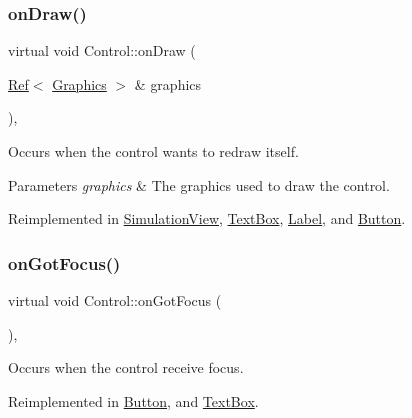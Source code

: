 \subsubsection{\texorpdfstring{onDraw()}{onDraw()}}
{\footnotesize\ttfamily virtual void Control\+::on\+Draw (\begin{DoxyParamCaption}\item[{\mbox{\hyperlink{class_ref}{Ref}}$<$ \mbox{\hyperlink{class_graphics}{Graphics}} $>$ \&}]{graphics }\end{DoxyParamCaption})\hspace{0.3cm}{\ttfamily [inline]}, {\ttfamily [virtual]}}



Occurs when the control wants to redraw itself. 


\begin{DoxyParams}{Parameters}
{\em graphics} & The graphics used to draw the control.\\
\hline
\end{DoxyParams}


Reimplemented in \mbox{\hyperlink{class_simulation_view_a088d2d9c386b7202fe0d552323c137c3}{Simulation\+View}}, \mbox{\hyperlink{class_text_box_abd8f18ee1d846bf8cdf0ab93b6302bf9}{Text\+Box}}, \mbox{\hyperlink{class_label_ac418a8328a971f5da7f46c9c6e9fd7e5}{Label}}, and \mbox{\hyperlink{class_button_afdb39226fa5833cdbbd6d061783024b7}{Button}}.

\mbox{\label{class_control_ac21652bd9bd20bd53eeab52432556a0c}} 
\subsubsection{\texorpdfstring{onGotFocus()}{onGotFocus()}}
{\footnotesize\ttfamily virtual void Control\+::on\+Got\+Focus (\begin{DoxyParamCaption}{ }\end{DoxyParamCaption})\hspace{0.3cm}{\ttfamily [inline]}, {\ttfamily [virtual]}}



Occurs when the control receive focus. 



Reimplemented in \mbox{\hyperlink{class_button_a3fd6af2ee1bdd52a0b61177f80ff7d2c}{Button}}, and \mbox{\hyperlink{class_text_box_acf8cced7a7c1ebb3b8bd72ee0901eef8}{Text\+Box}}.

